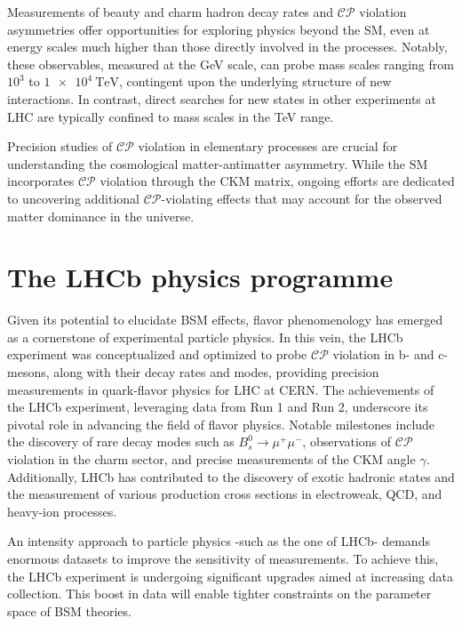 Measurements of beauty and charm hadron decay rates and $\mathcal{CP}$ violation asymmetries offer opportunities for exploring physics beyond the SM, even at energy scales much higher than those directly involved in the processes. Notably, these observables, measured at the GeV scale, can probe mass scales ranging from $10^3$ to $\SI{1e4}{\tera\eV}$, contingent upon the underlying structure of new interactions\cite{Isidori_2010}. In contrast, direct searches for new states in other experiments at LHC are typically confined to mass scales in the TeV range.

Precision studies of $\mathcal{CP}$ violation in elementary processes are crucial for understanding the cosmological matter-antimatter asymmetry. While the SM incorporates $\mathcal{CP}$ violation through the CKM matrix, ongoing efforts are dedicated to uncovering additional $\mathcal{CP}$-violating effects that may account for the observed matter dominance in the universe.

\section{The LHCb physics programme}
Given its potential to elucidate BSM effects, flavor phenomenology has emerged as a cornerstone of experimental particle physics. In this vein, the LHCb experiment was conceptualized and optimized to probe $\mathcal{CP}$ violation in b- and c-mesons, along with their decay rates and modes, providing precision measurements in quark-flavor physics for LHC at CERN.
The achievements of the LHCb experiment, leveraging data from Run 1 and Run 2, underscore its pivotal role in advancing the field of flavor physics. Notable milestones include the discovery of rare decay modes such as $B^0_s\rightarrow\mu^+\mu^-$\cite{PhysRevLett.111.101805}, observations of $\mathcal{CP}$ violation in the charm sector\cite{Maccolini:2022y6}, and precise measurements of the CKM angle $\gamma$\cite{Aaij_2016}. Additionally, LHCb has contributed to the discovery of exotic hadronic states\cite{FANG202266, PhysRevLett.115.072001} and the measurement of various production cross sections in electroweak, QCD, and heavy-ion processes\cite{ZBoson, Raab:2815873, Duan:2826531}.


An intensity approach to particle physics -such as the one of LHCb- demands enormous datasets to improve the sensitivity of measurements. To achieve this, the LHCb experiment is undergoing significant upgrades\cite{CERN-LHCC-2021-012} aimed at increasing data collection. This boost in data will enable tighter constraints on the parameter space of BSM theories. 


